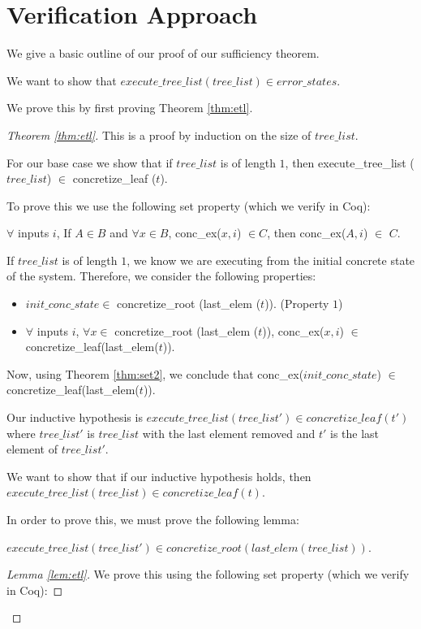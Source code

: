 \section{Verification Approach}
We give a basic outline of our proof of our sufficiency theorem.

We want to show that $execute\_tree\_list (tree\_list) \in error\_states$.

We prove this by first proving Theorem \ref{thm:etl}.

\begin{proof}[Theorem \ref{thm:etl}]
This is a proof by induction on the size of $tree\_list$.

For our base case we show that if $tree\_list$ is of length $1$, then execute\_tree\_list ($tree\_list$) $\in$ concretize\_leaf ($t$).


To prove this we use the following set property (which we verify in Coq):

\begin{theorem}
$\forall$ inputs $i$,
If $A \in B$ and 
$\forall x \in B$, conc\_ex($x, i$) $\in C$, then  conc\_ex($A, i$) $\in$ $C$.
\label{thm:set2}
\end{theorem}

If $tree\_list$ is of length $1$, we know we are executing from the initial concrete state of the system. Therefore, we consider the following properties:
\begin{itemize}
\item $init\_conc\_state \in$ 
  concretize\_root (last\_elem ($t$)). (Property $1$)
 \item $ \forall$ inputs $i$, 
 $\forall x \in$
  concretize\_root (last\_elem ($t$)),  
  conc\_ex($x, i$) $\in$ concretize\_leaf(last\_elem($t$)).
\end{itemize}

Now, using Theorem \ref{thm:set2}, we conclude that conc\_ex($init\_conc\_state$) $\in$ concretize\_leaf(last\_elem($t$)).

Our inductive hypothesis is  $execute\_tree\_list (tree\_list') \in concretize\_leaf (t')$ where $tree\_list'$ is $tree\_list$ with the last element removed and $t'$ is the last element of $tree\_list'$.

We want to show that if our inductive hypothesis holds, then $execute\_tree\_list (tree\_list) \in concretize\_leaf (t)$.

In order to prove this, we must prove the following lemma:
\begin{lemma} 
\label{lem:etl}
$execute\_tree\_list (tree\_list') \in concretize\_root (last\_elem (tree\_list))$.
\end{lemma}
\begin{proof}[Lemma \ref{lem:etl}]
We prove this using the following set property (which we verify in Coq):


\end{proof}
\end{proof}
